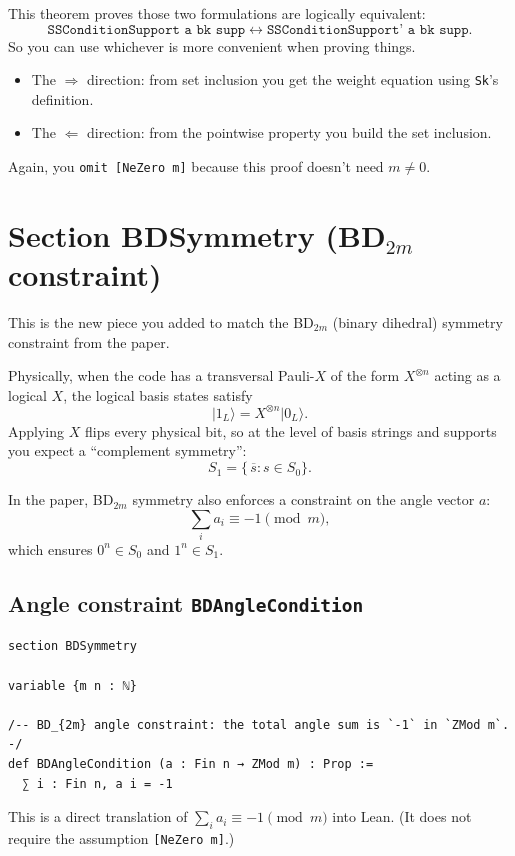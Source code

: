 \documentclass[11pt]{article}
\newcommand{\ket}[1]{\lvert #1 \rangle}
\begin{document}
This theorem proves those two formulations are logically equivalent:
\[
\texttt{SSConditionSupport a bk supp} \leftrightarrow  \texttt{SSConditionSupport' a bk supp}.
\]
So you can use whichever is more convenient when proving things.

\begin{itemize}
\item The $\Rightarrow$ direction: from set inclusion you get the weight equation using \texttt{Sk}'s definition.
\item The $\Leftarrow$ direction: from the pointwise property you build the set inclusion.
\end{itemize}

Again, you \texttt{omit [NeZero m]} because this proof doesn't need $m\neq 0$.

\section*{Section BDSymmetry (BD$_{2m}$ constraint)}

This is the new piece you added to match the BD$_{2m}$ (binary dihedral) symmetry constraint from the paper.

Physically, when the code has a transversal Pauli-$X$ of the form $X^{\otimes n}$ acting as a logical $X$, the logical basis states satisfy
\[
\ket{1_L} = X^{\otimes n} \ket{0_L}.
\]
Applying $X$ flips every physical bit, so at the level of basis strings and supports you expect a ``complement symmetry'':
\[
S_1 = \{\, \overline{s} : s \in S_0 \}.
\]

In the paper, BD$_{2m}$ symmetry also enforces a constraint on the angle vector $a$:
\[
\sum_i a_i \equiv -1 \pmod m,
\]
which ensures $0^n \in S_0$ and $1^n \in S_1$.

\subsection*{Angle constraint \texttt{BDAngleCondition}}

\begin{lstlisting}
section BDSymmetry

variable {m n : ℕ}

/-- BD_{2m} angle constraint: the total angle sum is `-1` in `ZMod m`. -/
def BDAngleCondition (a : Fin n → ZMod m) : Prop :=
  ∑ i : Fin n, a i = -1
\end{lstlisting}

This is a direct translation of $\sum_i a_i \equiv -1 \pmod m$ into Lean.
(It does not require the assumption \texttt{[NeZero m]}.)
\end{document}
